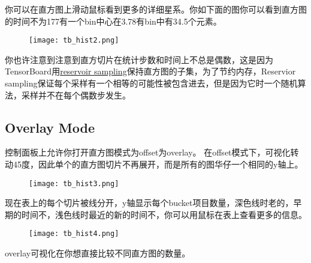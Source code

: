 你可以在直方图上滑动鼠标看到更多的详细星系。你如下面的图你可以看到直方图的时间不为177有一个bin中心在3.78有bin中有34.5个元素。
\begin{center}
\begin{figure}[H]
\texttt{[image: tb\_hist2.png]}
\end{figure}
\end{center}
你也许注意到注意到直方切片在统计步数和时间上不总是偶数，这是因为TensorBoard用\href{https://en.wikipedia.org/wiki/Reservoir\_sampling}{reservoir sampling}保持直方图的子集，为了节约内存，Reservior sampling保证每个采样有一个相等的可能性被包含进去，但是因为它时一个随机算法，采样并不在每个偶数步发生。
\subsection{Overlay Mode}
控制面板上允许你打开直方图模式为offset为overlay。
在offset模式下，可视化转动45度，因此单个的直方图切片不再展开，而是所有的图华仔一个相同的y轴上。
\begin{center}
\begin{figure}[H]
\texttt{[image: tb\_hist3.png]}
\end{figure}
\end{center}
现在表上的每个切片被线分开，y轴显示每个bucket项目数量，深色线时老的，早期的时间不，浅色线时最近的新的时间不，你可以用鼠标在表上查看更多的信息。
\begin{center}
\begin{figure}[H]
\texttt{[image: tb\_hist4.png]}
\end{figure}
\end{center}

overlay可视化在你想直接比较不同直方图的数量。
